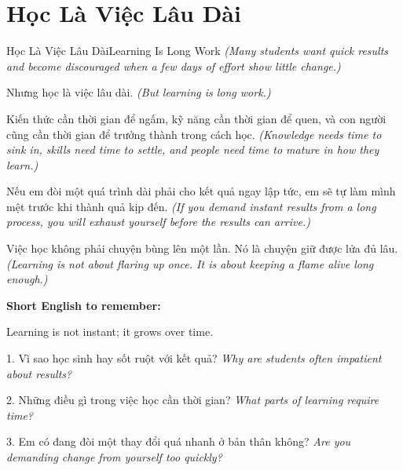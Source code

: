 \section{Học Là Việc Lâu Dài}
\begin{truyen}{Học Là Việc Lâu Dài}{Learning Is Long Work}
\textit{(Many students want quick results and become discouraged when a few days of effort show little change.)}

Nhưng học là việc lâu dài.
\textit{(But learning is long work.)}

Kiến thức cần thời gian để ngấm, kỹ năng cần thời gian để quen, và con người cũng cần thời gian để trưởng thành trong cách học.
\textit{(Knowledge needs time to sink in, skills need time to settle, and people need time to mature in how they learn.)}

Nếu em đòi một quá trình dài phải cho kết quả ngay lập tức, em sẽ tự làm mình mệt trước khi thành quả kịp đến.
\textit{(If you demand instant results from a long process, you will exhaust yourself before the results can arrive.)}
\end{truyen}

\begin{baihoc}
Việc học không phải chuyện bùng lên một lần. Nó là chuyện giữ được lửa đủ lâu.
\textit{(Learning is not about flaring up once. It is about keeping a flame alive long enough.)}
\end{baihoc}

\begin{ghinhoanh}
\textbf{Short English to remember:}

Learning is not instant; it grows over time.

\end{ghinhoanh}

\begin{tuhocnhanh}
1. Vì sao học sinh hay sốt ruột với kết quả? \textit{Why are students often impatient about results?}

2. Những điều gì trong việc học cần thời gian? \textit{What parts of learning require time?}

3. Em có đang đòi một thay đổi quá nhanh ở bản thân không? \textit{Are you demanding change from yourself too quickly?}
\end{tuhocnhanh}
\ngancach

